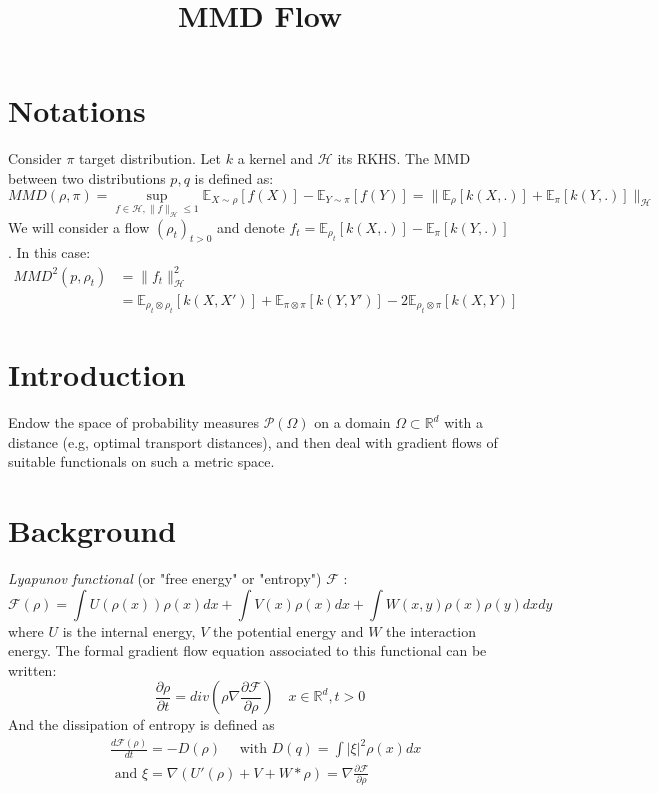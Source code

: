 \documentclass{article}
\title{MMD Flow}
\newcommand{\1}{\mathbbm 1}
\newcommand{\R}{{{\mathbb R}}}
\newcommand{\E}{{{\mathbb E}}}
\newcommand{\kH}{{{\mathcal H}}}
\newcommand{\F}{{{\mathcal F}}}
\theoremstyle{definition}
\begin{document}
\maketitle


\begin{abstract} 

\end{abstract}

\section{Notations}
Consider $\pi$ target distribution. Let $k$ a kernel and $\kH$ its RKHS. The MMD between two distributions $p,q$ is defined as:
\begin{equation}
    MMD(\rho,\pi)=\sup_{f \in \kH,  \|f\|_{\kH}\le 1} \E_{X \sim \rho}[f(X)]-\E_{Y \sim \pi}[f(Y)]=\|\E_{\rho}[k(X,.)] + \E_{\pi}[k(Y,.)]\|_{\kH}
\end{equation}
We will consider a flow $(\rho_t)_{t>0}$ and denote $f_t= \E_{\rho_t}[k(X,.)]- \E_{\pi}[k(Y,.)]$. In this case:
\begin{align}
MMD^2(p,\rho_t)&=\|f_t\|^2_{\kH}\\
&= \E_{\rho_t \otimes \rho_t}[k(X,X')]+\E_{\pi \otimes \pi}[k(Y,Y')] - 2\E_{\rho_t \otimes \pi}[k(X,Y)]
\end{align} 

\section{Introduction}
Endow the space of probability measures $\mathcal{P}(\Omega)$ on a domain $\Omega \subset \R^d$ with a distance (e.g, optimal transport distances), and then deal with gradient flows of suitable functionals on such a metric space.

\section{Background}

\textit{Lyapunov functional} (or "free energy" or "entropy") $\F$  \citep{villani2004trend}:
\begin{equation}
    \F(\rho)=\int U(\rho(x)) \rho(x)dx + \int V(x)\rho(x)dx + \int W(x,y)\rho(x)\rho(y)dxdy
\end{equation}
where  $U$ is the internal energy, $V$ the potential energy and $W$ the
interaction energy. The formal gradient flow equation associated to this functional can be written:
\begin{equation}
    \frac{\partial \rho}{\partial t}= div( \rho \nabla \frac{\partial \F}{\partial \rho}) \quad x \in \R^d , t>0
\end{equation}
And the dissipation of entropy is defined as %
\begin{align}
    &        \frac{d \F(\rho)}{dt} =-D(\rho) \quad \text{ with } D(q)= \int |\xi|^2 \rho(x)dx\\
    &\text{ and } \xi= \nabla (U'(\rho) + V + W * \rho)= \nabla \frac{\partial \F}{\partial \rho}
\end{align}
\end{document}
